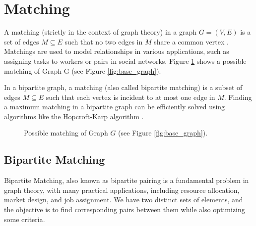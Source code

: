         \section{Matching}

            A matching (strictly in the context of graph theory) in a graph \( G = (V, E) \) is a set of edges \( M \subseteq E \) such that no two edges in \( M \) share a common vertex \cite{cormen, bondy1976graph}. Matchings are used to model relationships in various applications, such as assigning tasks to workers or pairs in social networks. Figure \ref{fig:possible_matching} shows a possible matching of Graph G (see Figure \ref{fig:base_graph}).
            
            In a bipartite graph, a matching (also called bipartite matching) is a subset of edges \( M \subseteq E \) such that each vertex is incident to at most one edge in \( M \). Finding a maximum matching in a bipartite graph can be efficiently solved using algorithms like the Hopcroft-Karp algorithm \cite{west2001introduction, diestel2017graph}.


            \begin{figure}[!ht]
                \centering
                \caption{Possible matching of Graph $G$ (see Figure \ref{fig:base_graph}).}
                \label{fig:possible_matching}
            \end{figure}
            
        \subsection{Bipartite Matching}

            Bipartite Matching, also known as bipartite pairing is a fundamental problem in graph theory, with many practical applications, including resource allocation, market design, and job assignment.
            We have two distinct sets of elements, and the objective is to find corresponding pairs between them while also optimizing some criteria.
            
